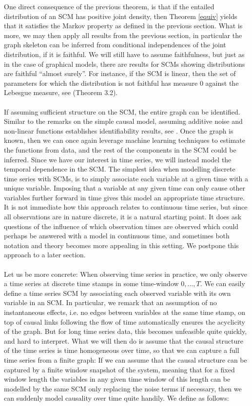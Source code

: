 \documentclass[11pt, a4paper]{memoir}
\theoremstyle{break}
\theoremstyle{break}
\theoremstyle{nonumberplain}
\begin{document}
One direct consequence of the previous theorem, is that if the entailed distribution of an SCM has positive joint density, then Theorem \ref{equiv} yields that it satisfies the Markov property as defined in the previous section. What is more, we may then apply all results from the previous section, in particular the graph skeleton can be inferred from conditional independences of the joint distribution, if it is faithful. We will still have to assume faithfulness, but just as in the case of graphical models, there are results for SCMs showing distributions are faithful \enquote{almost surely}. For instance, if the SCM is linear, then the set of parameters for which the distribution is not faithful has measure 0 against the Lebesgue measure, see \cite{Spirtes} (Theorem 3.2).\\\\
If assuming sufficient structure on the SCM, the entire graph can be identified. Similar to the remarks on the simple causal model, assuming additive noise and non-linear functions establishes identifiability results, see \cite{ANM3}. Once the graph is known, then we can once again leverage machine learning techniques to estimate the functions from data, and the rest of the components in the SCM could be inferred. Since we have our interest in time series, we will instead model the temporal dependence in the SCM. The simplest idea when modelling discrete time series with SCMs, is to simply associate each variable at a given time with a unique variable. Imposing that a variable at any given time can only cause other variables further forward in time gives this model an appropriate time structure. It is not immediate how this approach relates to continuous time series, but since all observations are in nature discrete, it is a natural starting point.  It does ask questions of the influence of which observation times are observed which could perhaps be answered with a model in continuous time, and sometimes both notation and theory becomes more appealing in this setting. We postpone this approach to a later section.\\\\
Let us be more concrete: When observing time series in practice, we only observe a time series at discrete time stamps in some time-window $0,\ldots, T$. We can easily define a time series SCM by associating each observed variable with its own variable in an SCM. In particular, we remark that an assumption of no instantaneous effects, i.e. no edges between variables at the same time stamp, on top of causal links following the flow of time automatically ensures the acyclicity of the graph. But for long time series data, this becomes unfeasible quite quickly, and hard to interpret. What we will then do is assume that the causal structure of the time series is time homogeneous over time, so that we can capture a full time series from a finite graph: If we can assume that the causal structure can be captured by a finite window snapshot of the system, meaning that for a fixed window length the variables in any given time window of this length can be modelled by the same SCM only replacing the noise terms if necessary, then we can suddenly model causality over time quite handily. We define as follows:
\end{document}
